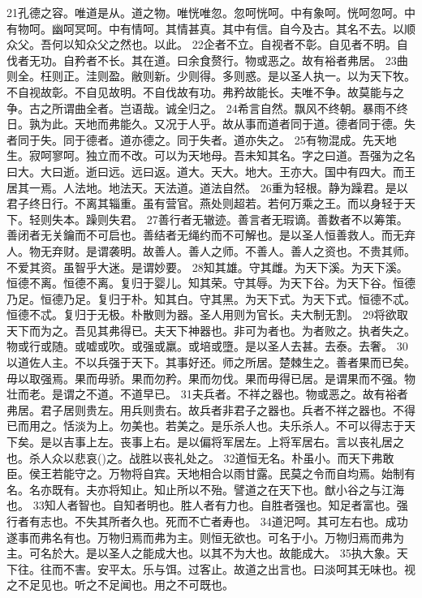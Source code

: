 \documentclass[a5paper,zihao=-4,oneside,UTF8]{ctexart}
\begin{document}
21孔德之容。唯道是从。道之物。唯恍唯忽。忽呵恍呵。中有象呵。恍呵忽呵。中有物呵。幽呵冥呵。中有情呵。其情甚真。其中有信。自今及古。其名不去。以顺众父。吾何以知众父之然也。以此。
22企者不立。自视者不彰。自见者不明。自伐者无功。自矜者不长。其在道。曰余食赘行。物或恶之。故有裕者弗居。
23曲则全。枉则正。洼则盈。敝则新。少则得。多则惑。是以圣人执一。以为天下牧。不自视故彰。不自见故明。不自伐故有功。弗矜故能长。夫唯不争。故莫能与之争。古之所谓曲全者。岂语哉。诚全归之。
24希言自然。飘风不终朝。暴雨不终日。孰为此。天地而弗能久。又况于人乎。故从事而道者同于道。德者同于德。失者同于失。同于德者。道亦德之。同于失者。道亦失之。
25有物混成。先天地生。寂呵寥呵。独立而不改。可以为天地母。吾未知其名。字之曰道。吾强为之名曰大。大曰逝。逝曰远。远曰返。道大。天大。地大。王亦大。国中有四大。而王居其一焉。人法地。地法天。天法道。道法自然。
26重为轻根。静为躁君。是以君子终日行。不离其辎重。虽有营官。燕处则超若。若何万乘之王。而以身轻于天下。轻则失本。躁则失君。
27善行者无辙迹。善言者无瑕谪。善数者不以筹策。善闭者无关鑰而不可启也。善结者无绳约而不可解也。是以圣人恒善救人。而无弃人。物无弃财。是谓袭明。故善人。善人之师。不善人。善人之资也。不贵其师。不爱其资。虽智乎大迷。是谓妙要。
28知其雄。守其雌。为天下溪。为天下溪。恒德不离。恒德不离。复归于婴儿。知其荣。守其辱。为天下谷。为天下谷。恒德乃足。恒德乃足。复归于朴。知其白。守其黑。为天下式。为天下式。恒德不忒。恒德不忒。复归于无极。朴散则为器。圣人用则为官长。夫大制无割。
29将欲取天下而为之。吾见其弗得已。夫天下神器也。非可为者也。为者败之。执者失之。物或行或随。或嘘或吹。或强或羸。或培或墮。是以圣人去甚。去泰。去奢。
30以道佐人主。不以兵强于天下。其事好还。师之所居。楚棘生之。善者果而已矣。毋以取强焉。果而毋骄。果而勿矜。果而勿伐。果而毋得已居。是谓果而不强。物壮而老。是谓之不道。不道早已。
31夫兵者。不祥之器也。物或恶之。故有裕者弗居。君子居则贵左。用兵则贵右。故兵者非君子之器也。兵者不祥之器也。不得已而用之。恬淡为上。勿美也。若美之。是乐杀人也。夫乐杀人。不可以得志于天下矣。是以吉事上左。丧事上右。是以偏将军居左。上将军居右。言以丧礼居之也。杀人众以悲哀()之。战胜以丧礼处之。
32道恒无名。朴虽小。而天下弗敢臣。侯王若能守之。万物将自宾。天地相合以雨甘露。民莫之令而自均焉。始制有名。名亦既有。夫亦将知止。知止所以不殆。譬道之在天下也。猷小谷之与江海也。
33知人者智也。自知者明也。胜人者有力也。自胜者强也。知足者富也。强行者有志也。不失其所者久也。死而不亡者寿也。
34道汜呵。其可左右也。成功遂事而弗名有也。万物归焉而弗为主。则恒无欲也。可名于小。万物归焉而弗为主。可名於大。是以圣人之能成大也。以其不为大也。故能成大。
35执大象。天下往。往而不害。安平太。乐与饵。过客止。故道之出言也。曰淡呵其无味也。视之不足见也。听之不足闻也。用之不可既也。
\end{document}
